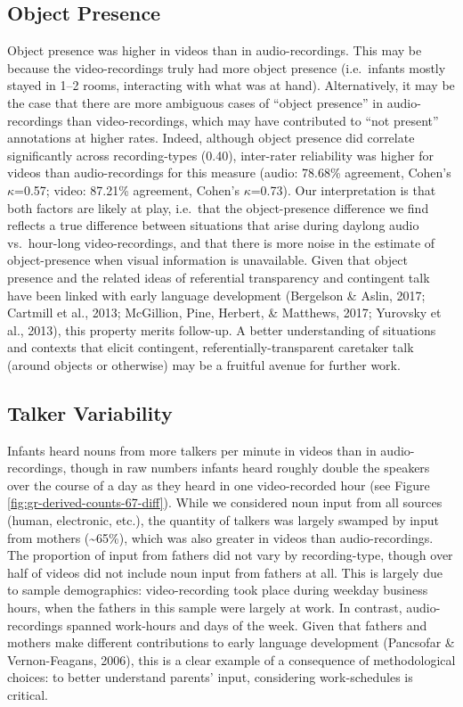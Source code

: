 \documentclass[man]{apa6}
\theoremstyle{definition}
\theoremstyle{definition}
\theoremstyle{definition}
\theoremstyle{remark}
\begin{document}
\subsection{Object Presence}\label{object-presence}

Object presence was higher in videos than in audio-recordings. This may
be because the video-recordings truly had more object presence
(i.e.~infants mostly stayed in 1--2 rooms, interacting with what was at
hand). Alternatively, it may be the case that there are more ambiguous
cases of \enquote{object presence} in audio-recordings than
video-recordings, which may have contributed to \enquote{not present}
annotations at higher rates. Indeed, although object presence did
correlate significantly across recording-types (0.40), inter-rater
reliability was higher for videos than audio-recordings for this measure
(audio: 78.68\% agreement, Cohen's \(\kappa\)=0.57; video: 87.21\%
agreement, Cohen's \(\kappa\)=0.73). Our interpretation is that both
factors are likely at play, i.e.~that the object-presence difference we
find reflects a true difference between situations that arise during
daylong audio vs.~hour-long video-recordings, and that there is more
noise in the estimate of object-presence when visual information is
unavailable. Given that object presence and the related ideas of
referential transparency and contingent talk have been linked with early
language development (Bergelson \& Aslin, 2017; Cartmill et al., 2013;
McGillion, Pine, Herbert, \& Matthews, 2017; Yurovsky et al., 2013),
this property merits follow-up. A better understanding of situations and
contexts that elicit contingent, referentially-transparent caretaker
talk (around objects or otherwise) may be a fruitful avenue for further
work.

\subsection{Talker Variability}\label{talker-variability}

Infants heard nouns from more talkers per minute in videos than in
audio-recordings, though in raw numbers infants heard roughly double the
speakers over the course of a day as they heard in one video-recorded
hour (see Figure \ref{fig:gr-derived-counts-67-diff}). While we
considered noun input from all sources (human, electronic, etc.), the
quantity of talkers was largely swamped by input from mothers
(\textasciitilde{}65\%), which was also greater in videos than
audio-recordings. The proportion of input from fathers did not vary by
recording-type, though over half of videos did not include noun input
from fathers at all. This is largely due to sample demographics:
video-recording took place during weekday business hours, when the
fathers in this sample were largely at work. In contrast,
audio-recordings spanned work-hours and days of the week. Given that
fathers and mothers make different contributions to early language
development (Pancsofar \& Vernon-Feagans, 2006), this is a clear example
of a consequence of methodological choices: to better understand
parents' input, considering work-schedules is critical.
\end{document}
